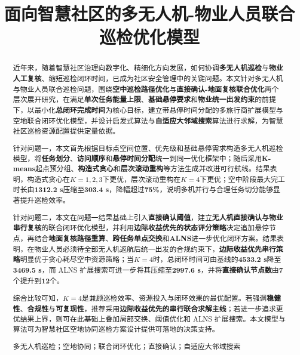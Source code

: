 \documentclass[12pt]{article}
\title{面向智慧社区的多无人机-物业人员联合巡检优化模型}
\makeatletter
\renewcommand{\maketitle}{
\begin{center}
{\heiti\zihao{-3}\@title\par}
\end{center}
\vspace{1em}
}
\makeatother
\begin{document}
\pagestyle{plain}
\setcounter{page}{1}
\singlespacing
\songti{}

\maketitle

\begin{abstract}
近年来，随着智慧社区治理向数字化、精细化方向发展，如何协调\textbf{多无人机巡检}与\textbf{物业人工复核}、缩短巡检闭环时间，已成为社区安全管理中的关键问题。本文针对多无人机与物业人员联合巡检问题，围绕\textbf{空中巡检路径优化}与\textbf{直接确认-地面复核联合优化}两个层次展开研究，在满足\textbf{单次任务能量上限}、\textbf{基础悬停要求}和\textbf{物业统一出发约束}的前提下，以最小化\textbf{总闭环完成时间}为核心目标，建立带悬停时间分配的多旅行商扩展模型与空地联合闭环优化模型，并设计启发式算法与\textbf{自适应大邻域搜索}算法进行求解，为智慧社区巡检资源配置提供定量依据。

针对问题一，本文首先根据目标点空间位置、优先级和基础悬停需求构造多无人机巡检模型，将\textbf{任务划分}、\textbf{访问顺序}和\textbf{悬停时间分配}统一到同一优化框架中；随后采用\textbf{K-means}起点预分组、\textbf{构造式贪心}和\textbf{层次滚动重构}等方法生成并改进可行航线。结果表明，构造式贪心在\textbf{$K=1,2,3$}下更优，层次滚动重构在\textbf{$K=4$}下更优；空中阶段最大完工时长由\textbf{1312.2 s}压缩至\textbf{303.4 s}，降幅超过\textbf{75\%}，说明多机并行与合理任务切分能够显著提升巡检效率。

针对问题二，本文在问题一结果基础上引入\textbf{直接确认阈值}，建立\textbf{无人机直接确认与物业串行复核}的联合闭环优化模型，并利用\textbf{边际收益优先的状态评分策略}决定追加悬停节点，再结合\textbf{地面复核路径重算}、\textbf{跨任务单点交换}和\textbf{ALNS}进一步优化闭环方案。结果表明，在物业人员必须待全部无人机返航后统一出发的合规约束下，\textbf{边际收益优先串行策略}明显优于贪心耗尽空中资源策略；当\textbf{$K=4$}时，总闭环时间可由基线的\textbf{4533.2 s}降至\textbf{3469.5 s}，而 ALNS 扩展搜索可进一步将其压缩至\textbf{2997.6 s}，并将\textbf{直接确认节点数}由\textbf{7}个提升到\textbf{12}个。

综合比较可知，\textbf{$K=4$}是兼顾巡检效率、资源投入与闭环效果的最优配置。若强调\textbf{稳健性}、\textbf{合规性}与\textbf{可复现性}，推荐采用\textbf{边际收益优先的串行联合求解主线}；若进一步追求更优结果上界，则可在此基础上叠加局部交换、阈值优化和 ALNS 扩展搜索。本文模型与算法可为智慧社区空地协同巡检方案设计提供可落地的决策支持。

\par{} 多无人机巡检；空地协同；联合闭环优化；直接确认；自适应大邻域搜索
\end{abstract}
\end{document}
